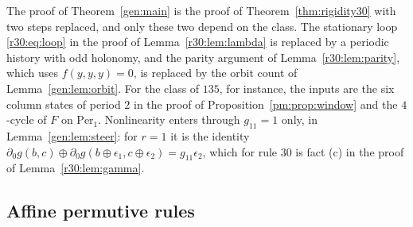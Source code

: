 \begin{remark}\label{pm:thm:135}
The proof of Theorem~\ref{gen:main} is the proof of Theorem~\ref{thm:rigidity30} with two steps replaced, and only these two depend on the class. The stationary loop \eqref{r30:eq:loop} in the proof of Lemma~\ref{r30:lem:lambda} is replaced by a periodic history with odd holonomy, and the parity argument of Lemma~\ref{r30:lem:parity}, which uses $f(y,y,y)=0$, is replaced by the orbit count of Lemma~\ref{gen:lem:orbit}. For the class of $135$, for instance, the inputs are the six column states of period $2$ in the proof of Proposition~\ref{pm:prop:window} and the $4$-cycle of $F$ on $\mathrm{Per}_1$. Nonlinearity enters through $g_{11}=1$ only, in Lemma~\ref{gen:lem:steer}: for $r=1$ it is the identity $\partial_0g(b,c)\oplus\partial_0g(b\oplus\epsilon_1,c\oplus\epsilon_2)=g_{11}\epsilon_2$, which for rule $30$ is fact (c) in the proof of Lemma~\ref{r30:lem:gamma}.
\end{remark}

\subsection{Affine permutive rules}\label{pm:sec:linear}

